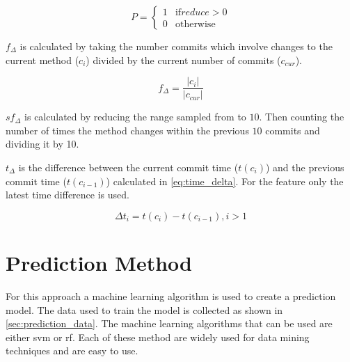 \begin{equation} 
\label{eq:change_prev}
P = \left\{\begin{matrix}
1 & \text{if} reduce > 0 \\
0 & \text{otherwise}
\end{matrix}\right.
\end{equation}

$f_{\Delta}$ is calculated by taking the number commits which involve changes to the current method ($c_i$) divided by the current number of commits ($c_{cur}$).

\begin{equation}
\label{eq:freq_change}
f_{\Delta} = \frac{|c_i|}{|c_{cur}|}
\end{equation}

$sf_{\Delta}$ is calculated by reducing the range sampled from to $10$. Then counting the number of times the method changes within the previous $10$ commits and dividing it by 10.


$t_\Delta$ is the difference between the current commit time ($t(c_i)$) and the previous commit time ($t(c_{i-1})$) calculated in \autoref{eq:time_delta}. For the feature only the latest time difference is used.

\begin{equation}
\label{eq:time_delta}
\Delta t_{i} = t(c_i) - t(c_{i-1}), i > 1
\end{equation}

\section{Prediction Method}
\label{sec:prediction_method}


For this approach a machine learning algorithm is used to create a prediction model. The data used to train the model is collected as shown in \autoref{sec:prediction_data}. The machine learning algorithms that can be used are either \gls{svm} or \gls{rf}. Each of these method are widely used for data mining techniques and are easy to use. 

